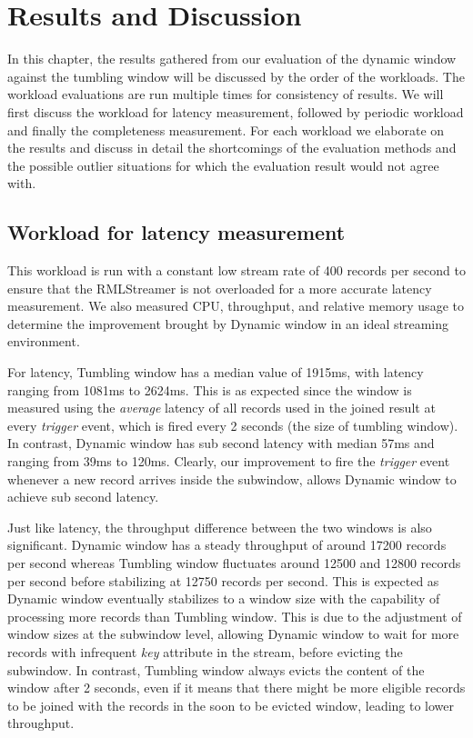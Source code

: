 \chapter{Results and Discussion}%
\label{chap:Results and Discussion}

In this chapter, the results gathered from our evaluation of the dynamic window against 
the tumbling window will be discussed by the order of the workloads. The workload 
evaluations are run multiple times for consistency of results. We will first 
discuss the workload for latency measurement, followed by periodic workload and 
finally the completeness measurement. For each workload we elaborate on the results
and discuss in detail the shortcomings of the evaluation methods and the 
possible outlier situations for which the evaluation result would not agree with.



\section{Workload for latency measurement}%
\label{sec:Results Workload for latency measurement}

This workload is run with a constant low stream rate
of 400 records per second
to ensure that 
the RMLStreamer is not overloaded for a more accurate latency measurement. We also measured 
CPU, throughput, and relative memory usage to determine the improvement brought by Dynamic window
in an ideal streaming environment.

For latency, Tumbling window has a median value of 1915ms, with latency ranging from 1081ms to 2624ms. 
This is as expected since the window is measured using the \emph{average} latency of all records used 
in the joined result at every \emph{trigger} event, which is fired every 2 seconds (the size of tumbling window).
In contrast, Dynamic window has sub second latency with median 57ms and ranging from 39ms to 120ms. Clearly, 
our improvement to fire the \emph{trigger} event whenever a new record arrives inside the subwindow, allows 
Dynamic window to achieve sub second latency. 

Just like latency, the throughput difference between the two windows is also significant. Dynamic window has a 
steady throughput of around 17200 records per second whereas Tumbling window fluctuates around 
12500 and 12800 records per second before stabilizing at 12750 records per second. This is expected as Dynamic 
window eventually stabilizes to a window size with the capability of processing more records than Tumbling window. This is 
due to the adjustment of window sizes at the subwindow level, allowing Dynamic window to wait for more records 
with infrequent \emph{key} attribute in the stream, before evicting the subwindow. In contrast, Tumbling window 
always evicts the content of the window after 2 seconds, even if it means that there might be more 
eligible records to be joined with the records in the soon to be evicted window, leading to lower throughput.  

